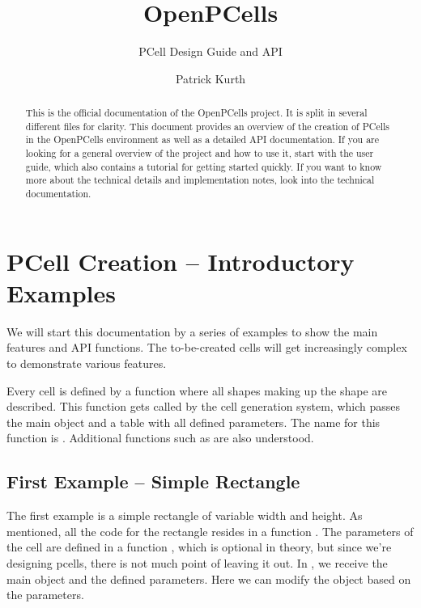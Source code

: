 

\title{OpenPCells}
\subtitle{PCell Design Guide and API}
\author{Patrick Kurth}


\maketitle
\begin{abstract}
    \noindent This is the official documentation of the OpenPCells project.  It is split in several different files for clarity. This document provides an overview
    of the creation of PCells in the OpenPCells environment as well as a detailed API documentation.  If you are looking for a general overview of the project and
    how to use it, start with the user guide, which also contains a tutorial for getting started quickly. If you want to know more about the technical details and
    implementation notes, look into the technical documentation.
\end{abstract}

\tableofcontents

\section{PCell Creation -- Introductory Examples}
We will start this documentation by a series of examples to show the main features and API functions. The to-be-created cells will get increasingly complex to
demonstrate various features.

Every cell is defined by a function where all shapes making up the shape are described. This function gets called by the cell generation system, which passes the
main object and a table with all defined parameters. The name for this function is . Additional functions such as 
are also understood.

\subsection{First Example -- Simple Rectangle}
The first example is a simple rectangle of variable width and height. As mentioned, all the code for the rectangle resides in a function .
The parameters of the cell are defined in a function , which is optional in theory, but since we're designing pcells, there is not much point
of leaving it out. In , we receive the main object and the defined parameters. Here we can modify the object based on the parameters.

